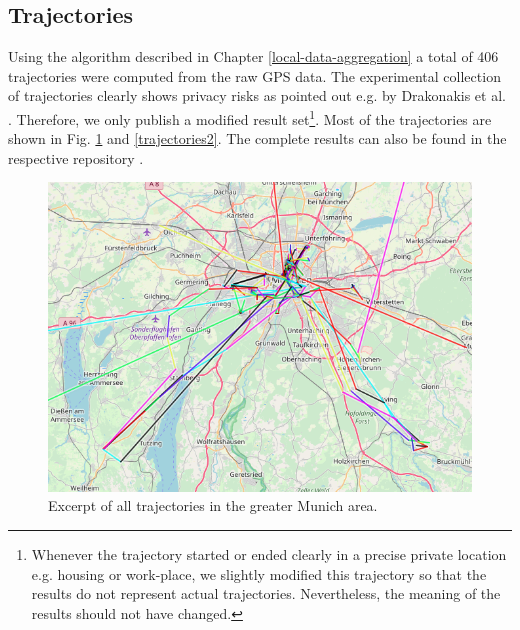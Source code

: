 \subsection{Trajectories}\label{trajectories}
Using the algorithm described in Chapter \ref{local-data-aggregation} a total of 406 trajectories were computed from the raw GPS data. The experimental collection of trajectories clearly shows privacy risks as pointed out e.g. by Drakonakis et al. \parencite{cellphone}. Therefore, we only publish a modified result set\footnote{Whenever the trajectory started or ended clearly in a precise private location e.g. housing or work-place, we slightly modified this trajectory so that the results do not represent actual trajectories. Nevertheless, the meaning of the results should not have changed.}. Most of the trajectories are shown in Fig. \ref{trajectories1} and \ref{trajectories2}. The complete results can also be found in the respective repository \parencite{github-results} .

\begin{figure}[h!]
	\includegraphics[width=\textwidth]{data/trajectories-2.png}
	\caption{Excerpt of all trajectories in the greater Munich area.}
	\label{trajectories1}
\end{figure}

